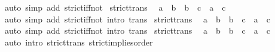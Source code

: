\begin{isabellebody}
\isamarkupfalse%
\ {\isacharparenleft}{\kern0pt}auto\ simp\ add{\isacharcolon}{\kern0pt}\ strict{\isacharunderscore}{\kern0pt}iff{\isacharunderscore}{\kern0pt}not{\isacharparenright}{\kern0pt}%
\endisatagproof
{\isafoldproof}%
%
\isadelimproof
\isanewline
%
\endisadelimproof
\isanewline
{}\isamarkupfalse%
\ strict{\isacharunderscore}{\kern0pt}trans{}{\isacharcolon}{\kern0pt}\isanewline
\ \ {\isacartoucheopen}a\ \isactrlbold {\isasymle}\ b\ {\isasymLongrightarrow}\ b\ \isactrlbold {\isacharless}{\kern0pt}\ c\ {\isasymLongrightarrow}\ a\ \isactrlbold {\isacharless}{\kern0pt}\ c{\isacartoucheclose}\isanewline
%
\isadelimproof
\ \ %
\endisadelimproof
%
\isatagproof
{}\isamarkupfalse%
\ {\isacharparenleft}{\kern0pt}auto\ simp\ add{\isacharcolon}{\kern0pt}\ strict{\isacharunderscore}{\kern0pt}iff{\isacharunderscore}{\kern0pt}not\ intro{\isacharcolon}{\kern0pt}\ trans{\isacharparenright}{\kern0pt}%
\endisatagproof
{\isafoldproof}%
%
\isadelimproof
\isanewline
%
\endisadelimproof
\isanewline
{}\isamarkupfalse%
\ strict{\isacharunderscore}{\kern0pt}trans{}{\isacharcolon}{\kern0pt}\isanewline
\ \ {\isacartoucheopen}a\ \isactrlbold {\isacharless}{\kern0pt}\ b\ {\isasymLongrightarrow}\ b\ \isactrlbold {\isasymle}\ c\ {\isasymLongrightarrow}\ a\ \isactrlbold {\isacharless}{\kern0pt}\ c{\isacartoucheclose}\isanewline
%
\isadelimproof
\ \ %
\endisadelimproof
%
\isatagproof
{}\isamarkupfalse%
\ {\isacharparenleft}{\kern0pt}auto\ simp\ add{\isacharcolon}{\kern0pt}\ strict{\isacharunderscore}{\kern0pt}iff{\isacharunderscore}{\kern0pt}not\ intro{\isacharcolon}{\kern0pt}\ trans{\isacharparenright}{\kern0pt}%
\endisatagproof
{\isafoldproof}%
%
\isadelimproof
\isanewline
%
\endisadelimproof
\isanewline
{}\isamarkupfalse%
\ strict{\isacharunderscore}{\kern0pt}trans{\isacharcolon}{\kern0pt}\isanewline
\ \ {\isacartoucheopen}a\ \isactrlbold {\isacharless}{\kern0pt}\ b\ {\isasymLongrightarrow}\ b\ \isactrlbold {\isacharless}{\kern0pt}\ c\ {\isasymLongrightarrow}\ a\ \isactrlbold {\isacharless}{\kern0pt}\ c{\isacartoucheclose}\isanewline
%
\isadelimproof
\ \ %
\endisadelimproof
%
\isatagproof
{}\isamarkupfalse%
\ {\isacharparenleft}{\kern0pt}auto\ intro{\isacharcolon}{\kern0pt}\ strict{\isacharunderscore}{\kern0pt}trans{}\ strict{\isacharunderscore}{\kern0pt}implies{\isacharunderscore}{\kern0pt}order{\isacharparenright}{\kern0pt}%
\endisatagproof
{\isafoldproof}%
%
\isadelimproof
\isanewline
%
\endisadelimproof
\isanewline
{}\isamarkupfalse%

\end{isabellebody}
